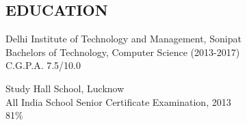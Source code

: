 \documentclass[margin]{res}
\begin{document}
  
\address { A-503, Palladium Grand Society, Dhanori, Pune - 411015 (881-6974-354) \\ Email: \href {mailto:divij.sehgaal7@gmail.com}{divij.sehgaal7@gmail.com} |  \href {http://www.linkedin.com/in/sehgaldivij/}{LinkedIn} | \href {http://www.github.com/SehgalDivij/} {Github}}
\begin{resume}

\section{EDUCATION}       
				Delhi Institute of Technology and Management, Sonipat \\
                Bachelors of Technology, Computer Science (2013-2017) \\
                C.G.P.A. 7.5/10.0

				Study Hall School, Lucknow \\
                All India School Senior Certificate Examination, 2013 \\
                81\%


\end{resume}
\end{document}
